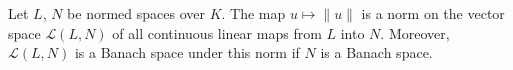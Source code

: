 Let $L$, $N$ be normed spaces over $K$. The map $u \mapsto \|u\|$ is a norm on the vector space $\mathcal{L}(L, N)$ of all continuous linear maps from $L$ into $N$. Moreover, $\mathcal{L}(L, N)$ is a Banach space under this norm if $N$ is a Banach space.

